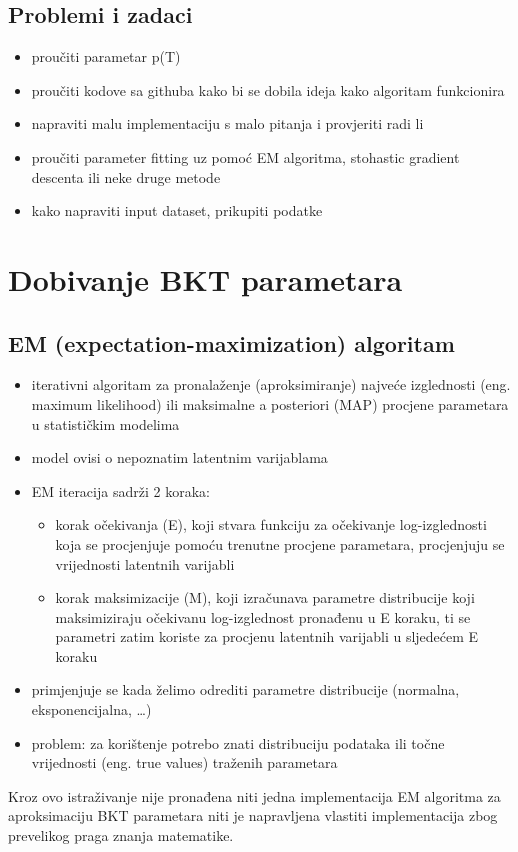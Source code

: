 \documentclass{report}
\begin{document}
	\section{Problemi i zadaci}
	\begin{itemize}
		\item proučiti parametar p(T)
		\item proučiti kodove sa githuba kako bi se dobila ideja kako algoritam funkcionira
		\item napraviti malu implementaciju s malo pitanja i provjeriti radi li
		\item proučiti parameter fitting uz pomoć EM algoritma, stohastic gradient descenta ili neke druge metode
		\item kako napraviti input dataset, prikupiti podatke
		
	
	\end{itemize}
	\chapter{Dobivanje BKT parametara}
	\section{EM (expectation-maximization) algoritam}
		\begin{itemize}
			\item iterativni algoritam za pronalaženje (aproksimiranje) najveće izglednosti (eng. maximum likelihood) ili maksimalne a posteriori (MAP) procjene parametara u statističkim modelima
			\item model ovisi o nepoznatim latentnim varijablama
			\item EM iteracija sadrži 2 koraka:
				\begin{itemize}
					\item 	korak očekivanja (E), koji stvara funkciju za očekivanje log-izglednosti koja se procjenjuje pomoću trenutne procjene parametara, procjenjuju se vrijednosti latentnih varijabli
					\item 	korak maksimizacije (M), koji izračunava parametre distribucije koji maksimiziraju očekivanu log-izglednost pronađenu u E koraku, ti se parametri zatim koriste za procjenu latentnih varijabli u sljedećem E koraku
				\end{itemize}
			
			\item primjenjuje se kada želimo odrediti parametre distribucije (normalna, eksponencijalna, …)
			\item problem: za korištenje potrebo znati distribuciju podataka ili točne vrijednosti (eng. true values) traženih parametara
			
		\end{itemize}
	Kroz ovo istraživanje nije pronađena niti jedna implementacija EM algoritma za aproksimaciju BKT parametara niti je napravljena vlastiti implementacija zbog prevelikog praga znanja matematike.
	
\end{document}
